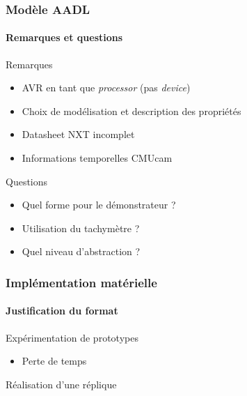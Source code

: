 \documentclass{beamer}
\begin{document}
  \begin{frame}
    \frametitle{Modèle AADL}
    \framesubtitle{Remarques et questions}

    Remarques
    \begin{itemize}
      \item AVR en tant que {\it processor} (pas {\it device})
      \item Choix de modélisation et description des propriétés
      \item Datasheet NXT incomplet
      \item Informations temporelles CMUcam
    \end{itemize} \vspace{1em}

    Questions
    \begin{itemize}
      \item Quel forme pour le démonstrateur ?
      \item Utilisation du tachymètre ?
      \item Quel niveau d’abstraction ?
    \end{itemize}
  \end{frame}


  \begin{frame}
    \frametitle{Implémentation matérielle}
    \framesubtitle{Justification du format}

    Expérimentation de prototypes
    \begin{itemize}
      \item Perte de temps
    \end{itemize} \vspace{1em}

    Réalisation d’une réplique
  \end{frame}
\end{document}
